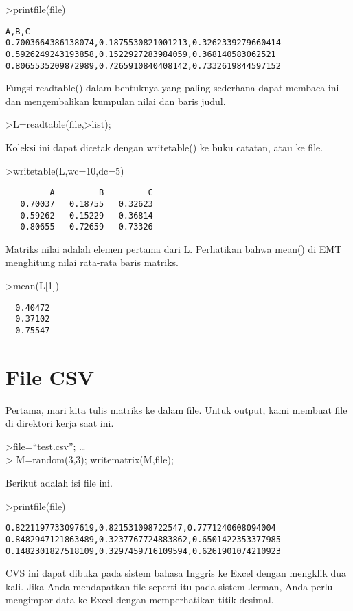 \documentclass[
]{book}
\begin{document}
\textgreater printfile(file)

\begin{verbatim}
A,B,C
0.7003664386138074,0.1875530821001213,0.3262339279660414
0.5926249243193858,0.1522927283984059,0.368140583062521
0.8065535209872989,0.7265910840408142,0.7332619844597152
\end{verbatim}

Fungsi readtable() dalam bentuknya yang paling sederhana dapat membaca ini dan mengembalikan kumpulan nilai dan baris judul.

\textgreater L=readtable(file,\textgreater list);

Koleksi ini dapat dicetak dengan writetable() ke buku catatan, atau ke file.

\textgreater writetable(L,wc=10,dc=5)

\begin{verbatim}
         A         B         C
   0.70037   0.18755   0.32623
   0.59262   0.15229   0.36814
   0.80655   0.72659   0.73326
\end{verbatim}

Matriks nilai adalah elemen pertama dari L. Perhatikan bahwa mean() di EMT menghitung nilai rata-rata baris matriks.

\textgreater mean(L{[}1{]})

\begin{verbatim}
  0.40472 
  0.37102 
  0.75547 
\end{verbatim}

\section{File CSV}\label{file-csv}

Pertama, mari kita tulis matriks ke dalam file. Untuk output, kami membuat file di direktori kerja saat ini.

\textgreater file=``test.csv''; \ldots{}\\
\textgreater{} M=random(3,3); writematrix(M,file);

Berikut adalah isi file ini.

\textgreater printfile(file)

\begin{verbatim}
0.8221197733097619,0.821531098722547,0.7771240608094004
0.8482947121863489,0.3237767724883862,0.6501422353377985
0.1482301827518109,0.3297459716109594,0.6261901074210923
\end{verbatim}

CVS ini dapat dibuka pada sistem bahasa Inggris ke Excel dengan mengklik dua kali. Jika Anda mendapatkan file seperti itu pada sistem Jerman, Anda perlu mengimpor data ke Excel dengan memperhatikan titik desimal.
\end{document}
